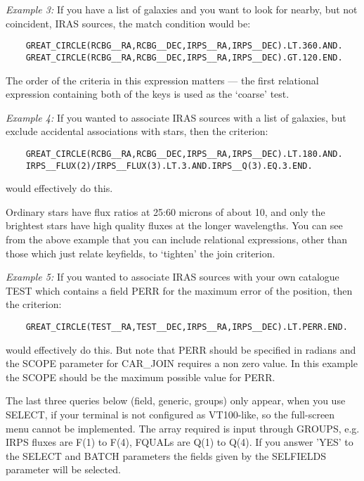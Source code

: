 {\em Example 3:} If you have a list of galaxies and you want to look for 
nearby, but not coincident, IRAS sources, the match condition would be:
\begin{verbatim}
    GREAT_CIRCLE(RCBG__RA,RCBG__DEC,IRPS__RA,IRPS__DEC).LT.360.AND.
    GREAT_CIRCLE(RCBG__RA,RCBG__DEC,IRPS__RA,IRPS__DEC).GT.120.END.
\end{verbatim}
The order of the criteria in this expression matters --- the first relational
expression containing both of the keys is used as the `coarse' test.

{\em Example 4:} If you wanted to associate IRAS sources with a list of
galaxies,  but exclude accidental associations with stars, then the criterion:
\begin{verbatim}
    GREAT_CIRCLE(RCBG__RA,RCBG__DEC,IRPS__RA,IRPS__DEC).LT.180.AND.
    IRPS__FLUX(2)/IRPS__FLUX(3).LT.3.AND.IRPS__Q(3).EQ.3.END.
\end{verbatim}
would effectively do this.

Ordinary stars have flux ratios at 25:60 microns of about 10, and only the
brightest stars have high quality fluxes at the longer wavelengths.
You can see from the above example that you can include relational expressions,
other than those which just relate keyfields, to `tighten' the join criterion.

{\em Example 5:} If you wanted to associate IRAS sources with your own 
catalogue TEST which contains a field PERR for the maximum error of the 
position, then the criterion:
\begin{verbatim}
    GREAT_CIRCLE(TEST__RA,TEST__DEC,IRPS__RA,IRPS__DEC).LT.PERR.END.
\end{verbatim}
would effectively do this. But note that PERR should be specified in radians
and the SCOPE parameter for CAR\_JOIN requires a non zero value. In this example
the SCOPE should be the maximum possible value for PERR.

The last three queries below (field, generic, groups) only appear, when you use
SELECT, if your terminal is not configured as VT100-like, so the full-screen 
menu cannot be implemented.
The array required is input through GROUPS, e.g. IRPS fluxes are F(1) to 
F(4), FQUALs are Q(1) to Q(4).
If you answer 'YES' to the SELECT and BATCH parameters the fields given by the
SELFIELDS parameter will be selected.

